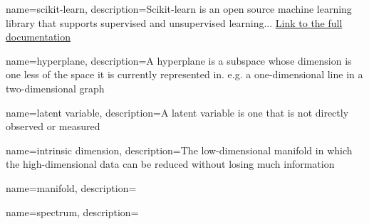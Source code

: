 
{
    name=scikit-learn,
    description={Scikit-learn is an open source machine learning library that supports supervised and unsupervised learning... \href{https://scikit-learn.org/stable/getting_started.html}{Link to the full documentation}}
}

{
    name=hyperplane,
    description={A hyperplane is a subspace whose dimension is one less of the space it is currently represented in. e.g. a one-dimensional line in a two-dimensional graph}
}

{
    name=latent variable,
    description={A latent variable is one that is not directly observed or measured \cite{rosipal2005overview}}
}

{
    name=intrinsic dimension,
    description={The low-dimensional manifold in which the high-dimensional data can be reduced without losing much information \cite{GeometricStructureWangCh1}}
}

{
    name=manifold,
    description={}
}

{
    name=spectrum,
    description={}
}


